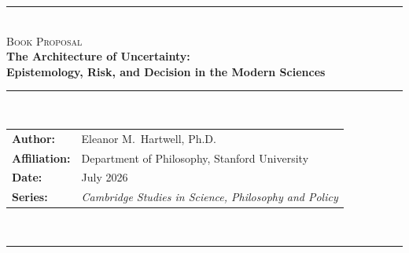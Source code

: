 \documentclass[11pt,a4paper]{article}
\begin{document}
\pagestyle{plain}

\begin{center}
  {\color{rule}\rule{\linewidth}{1.2pt}}\\[4pt]
  {\color{accent}\scshape\small Book Proposal}\\[6pt]
  {\LARGE\bfseries The Architecture of Uncertainty:\\[2pt]
    \large\mdseries Epistemology, Risk, and Decision in the Modern Sciences}\\[10pt]
  {\color{rule}\rule{\linewidth}{0.6pt}}\\[8pt]
  \begin{tabular}{@{}ll@{}}
    \textbf{Author:}      & Eleanor M.\ Hartwell, Ph.D.\\
    \textbf{Affiliation:} & Department of Philosophy, Stanford University\\
    \textbf{Date:}        & July 2026\\
    \textbf{Series:}      & \textit{Cambridge Studies in Science, Philosophy and Policy}\\
  \end{tabular}\\[6pt]
  {\color{rule}\rule{\linewidth}{1.2pt}}
\end{center}

\vspace{4pt}









\end{document}
